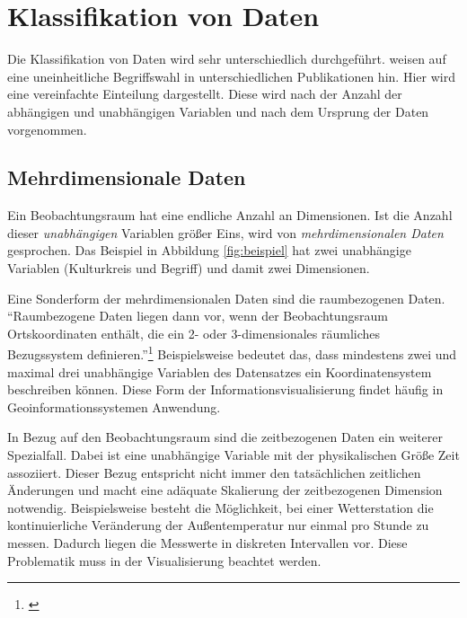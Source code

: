 \documentclass[a4paper, 
               12pt,
               DIV=calc,
               version=first,
               pdftex,
               headsepline,
               footsepline,
               bibtotocnumbered,
               liststotocnumbered]{scrreprt}
\begin{document}
\section{Klassifikation von Daten}
\label{sec:KlassifikationDaten}

Die Klassifikation von Daten wird sehr unterschiedlich durchgeführt.
\cite{Schumann} weisen auf eine uneinheitliche Begriffswahl in unterschiedlichen
Publikationen hin.
Hier wird eine vereinfachte Einteilung dargestellt. Diese wird nach der Anzahl der abhängigen und
unabhängigen Variablen und nach dem Ursprung der Daten vorgenommen.

\subsection{Mehrdimensionale Daten}
Ein Beobachtungsraum hat eine endliche Anzahl an Dimensionen. Ist die Anzahl
dieser \textit{unabhängigen} Variablen größer Eins, wird von \textit{mehrdimensionalen Daten} gesprochen. Das Beispiel
in Abbildung \ref{fig:beispiel} hat zwei unabhängige
Variablen (Kulturkreis und Begriff) und damit zwei Dimensionen.

Eine Sonderform der mehrdimensionalen Daten sind die raumbezogenen Daten.
"`Raumbezogene Daten liegen dann vor, wenn der Beobachtungsraum Ortskoordinaten enthält,
die ein 2- oder 3-dimensionales räumliches Bezugssystem definieren."'\footnote{\citep[S.\,220]{Schumann}}
Beispielsweise bedeutet das, dass mindestens zwei und maximal drei unabhängige Variablen des Datensatzes
ein Koordinatensystem beschreiben können. Diese Form der Informationsvisualisierung findet häufig
in Geoinformationssystemen Anwendung.

In Bezug auf den Beobachtungsraum sind die zeitbezogenen Daten ein weiterer Spezialfall.
Dabei ist eine unabhängige Variable mit der physikalischen Größe Zeit assoziiert.
Dieser Bezug entspricht nicht immer den tatsächlichen zeitlichen Änderungen und macht
eine adäquate Skalierung der zeitbezogenen Dimension notwendig.
Beispielsweise besteht die Möglichkeit, bei einer Wetterstation die kontinuierliche Veränderung der Außentemperatur
nur einmal pro Stunde zu messen. Dadurch liegen die Messwerte in diskreten Intervallen vor.
Diese Problematik muss in der Visualisierung beachtet werden.
\end{document}
